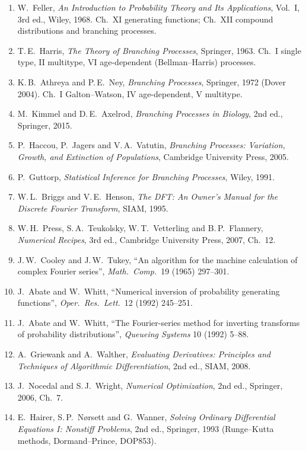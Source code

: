 \documentclass[11pt]{article}
\theoremstyle{definition}
\theoremstyle{remark}
\begin{document}
\begin{enumerate}\small
\item[{[1]}] W.\ Feller, \emph{An Introduction to Probability Theory and Its Applications}, Vol.~I, 3rd ed., Wiley, 1968. Ch.~XI generating functions; Ch.~XII compound distributions and branching processes.
\item[{[2]}] T.\,E.\ Harris, \emph{The Theory of Branching Processes}, Springer, 1963. Ch.~I single type, II multitype, VI age-dependent (Bellman--Harris) processes.
\item[{[3]}] K.\,B.\ Athreya and P.\,E.\ Ney, \emph{Branching Processes}, Springer, 1972 (Dover 2004). Ch.~I Galton--Watson, IV age-dependent, V multitype.
\item[{[4]}] M.\ Kimmel and D.\,E.\ Axelrod, \emph{Branching Processes in Biology}, 2nd ed., Springer, 2015.
\item[{[5]}] P.\ Haccou, P.\ Jagers and V.\,A.\ Vatutin, \emph{Branching Processes: Variation, Growth, and Extinction of Populations}, Cambridge University Press, 2005.
\item[{[6]}] P.\ Guttorp, \emph{Statistical Inference for Branching Processes}, Wiley, 1991.
\item[{[7]}] W.\,L.\ Briggs and V.\,E.\ Henson, \emph{The DFT: An Owner's Manual for the Discrete Fourier Transform}, SIAM, 1995.
\item[{[8]}] W.\,H.\ Press, S.\,A.\ Teukolsky, W.\,T.\ Vetterling and B.\,P.\ Flannery, \emph{Numerical Recipes}, 3rd ed., Cambridge University Press, 2007, Ch.~12.
\item[{[9]}] J.\,W.\ Cooley and J.\,W.\ Tukey, ``An algorithm for the machine calculation of complex Fourier series'', \emph{Math.\ Comp.}\ 19 (1965) 297--301.
\item[{[10]}] J.\ Abate and W.\ Whitt, ``Numerical inversion of probability generating functions'', \emph{Oper.\ Res.\ Lett.}\ 12 (1992) 245--251.
\item[{[11]}] J.\ Abate and W.\ Whitt, ``The Fourier-series method for inverting transforms of probability distributions'', \emph{Queueing Systems} 10 (1992) 5--88.
\item[{[12]}] A.\ Griewank and A.\ Walther, \emph{Evaluating Derivatives: Principles and Techniques of Algorithmic Differentiation}, 2nd ed., SIAM, 2008.
\item[{[13]}] J.\ Nocedal and S.\,J.\ Wright, \emph{Numerical Optimization}, 2nd ed., Springer, 2006, Ch.~7.
\item[{[14]}] E.\ Hairer, S.\,P.\ N\o rsett and G.\ Wanner, \emph{Solving Ordinary Differential Equations I: Nonstiff Problems}, 2nd ed., Springer, 1993 (Runge--Kutta methods, Dormand--Prince, DOP853).

\end{enumerate}
\end{document}
